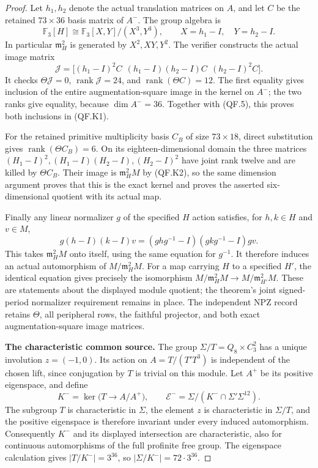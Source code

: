 \begin{proof}
Let $h_1,h_2$ denote the actual translation matrices
on $A$, and let $C$ be the retained $73\times36$
basis matrix of $A^-$.  The group algebra is
\[
 \mathbb F_3[H]\cong
 \mathbb F_3[X,Y]/(X^3,Y^3),\qquad
 X=h_1-I,\quad Y=h_2-I.
                                                       \tag{QF.K2}
\]
In particular $\mathfrak m_H^2$ is generated by
$X^2,XY,Y^2$.
The verifier constructs the actual image matrix
\[
 \mathcal J=
 \bigl[(h_1-I)^2C\ \ (h_1-I)(h_2-I)C\ \ (h_2-I)^2C\bigr].
                                                       \tag{QF.K3}
\]
It checks $\Theta\mathcal J=0$,
$\operatorname{rank}\mathcal J=24$, and
$\operatorname{rank}(\Theta C)=12$.
The first equality gives inclusion of the entire
augmentation-square image in the kernel on $A^-$;
the two ranks give equality, because $\dim A^-=36$.
Together with (QF.5), this proves both inclusions
in (QF.K1).

For the retained primitive multiplicity basis
$C_B$ of size $73\times18$, direct substitution
gives $\operatorname{rank}(\Theta C_B)=6$.
On its eighteen-dimensional domain the three
matrices $(H_1-I)^2,(H_1-I)(H_2-I),(H_2-I)^2$
have joint rank twelve and are killed by
$\Theta C_B$.  Their image is
$\mathfrak m_H^2M$ by (QF.K2), so the same
dimension argument proves that this is the exact
kernel and proves the asserted six-dimensional
quotient with its actual map.

Finally any linear normalizer $g$ of the specified
$H$ action satisfies, for $h,k\in H$ and $v\in M$,
\[
 g(h-I)(k-I)v
 =(ghg^{-1}-I)(gkg^{-1}-I)gv.
                                                       \tag{QF.K4}
\]
This takes $\mathfrak m_H^2M$ onto itself,
using the same equation for $g^{-1}$.
It therefore induces an actual automorphism
of $M/\mathfrak m_H^2M$.
For a map carrying $H$ to a specified $H'$,
the identical equation gives precisely the
isomorphism $M/\mathfrak m_H^2M\to
M/\mathfrak m_{H'}^2M$.
These are statements about the displayed module
quotient; the theorem's joint signed-period
normalizer requirement remains in place.
The independent NPZ record retains $\Theta$,
all peripheral rows, the faithful projector,
and both exact augmentation-square image matrices.

\textbf{The characteristic common source.}
The group $\Sigma/T=Q_8\times C_3^2$ has a unique
involution $z=(-1,0)$.  Its action on
$A=T/(T'T^3)$ is independent of the chosen lift,
since conjugation by $T$ is trivial on this module.
Let $A^+$ be its positive eigenspace, and define
\[
 K^- =\ker\bigl(T\to A/A^+\bigr),\qquad
 \mathcal E^-=
       \Sigma/(K^-\cap\Sigma'\Sigma^{12}).              \tag{QF.6}
\]
The subgroup $T$ is characteristic in $\Sigma$,
the element $z$ is characteristic in $\Sigma/T$,
and the positive eigenspace is therefore invariant
under every induced automorphism.  Consequently
$K^-$ and its displayed intersection are
characteristic, also for continuous automorphisms
of the full profinite free group.
The eigenspace calculation gives
$|T/K^-|=3^{36}$, so
$|\Sigma/K^-|=72\cdot3^{36}$.


\end{proof}
